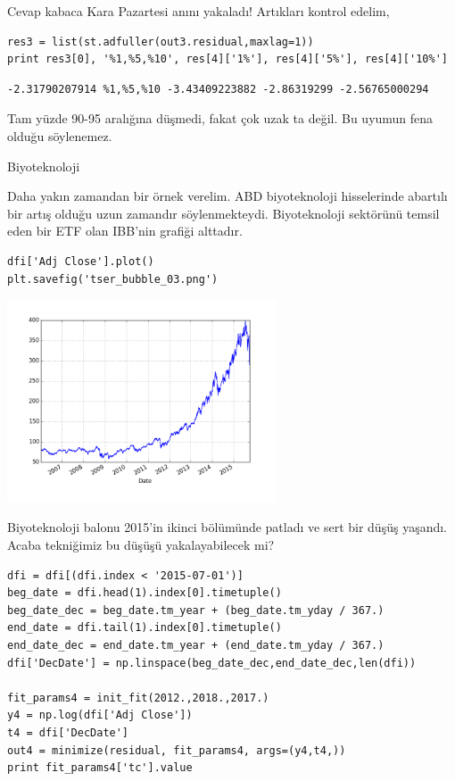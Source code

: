 \documentclass[12pt,fleqn]{article}\usepackage{../../common}
\begin{document}
Cevap kabaca Kara Pazartesi anını yakaladı! Artıkları kontrol edelim,

\begin{verbatim}
res3 = list(st.adfuller(out3.residual,maxlag=1))
print res3[0], '%1,%5,%10', res[4]['1%'], res[4]['5%'], res[4]['10%']
\end{verbatim}

\begin{verbatim}
-2.31790207914 %1,%5,%10 -3.43409223882 -2.86319299 -2.56765000294
\end{verbatim}

Tam yüzde 90-95 aralığına düşmedi, fakat çok uzak ta değil. Bu uyumun fena
olduğu söylenemez.

Biyoteknoloji

Daha yakın zamandan bir örnek verelim. ABD biyoteknoloji hisselerinde
abartılı bir artış olduğu uzun zamandır söylenmekteydi. Biyoteknoloji
sektörünü temsil eden bir ETF olan IBB'nin grafiği alttadır.

\begin{verbatim}
dfi['Adj Close'].plot()
plt.savefig('tser_bubble_03.png')
\end{verbatim}

\includegraphics[height=6cm]{tser_bubble_03.png}

Biyoteknoloji balonu 2015'in ikinci bölümünde patladı ve sert bir düşüş
yaşandı. Acaba tekniğimiz bu düşüşü yakalayabilecek mi?

\begin{verbatim}
dfi = dfi[(dfi.index < '2015-07-01')] 
beg_date = dfi.head(1).index[0].timetuple()
beg_date_dec = beg_date.tm_year + (beg_date.tm_yday / 367.)
end_date = dfi.tail(1).index[0].timetuple()
end_date_dec = end_date.tm_year + (end_date.tm_yday / 367.)
dfi['DecDate'] = np.linspace(beg_date_dec,end_date_dec,len(dfi))

fit_params4 = init_fit(2012.,2018.,2017.)
y4 = np.log(dfi['Adj Close'])
t4 = dfi['DecDate']
out4 = minimize(residual, fit_params4, args=(y4,t4,))
print fit_params4['tc'].value 
\end{verbatim}
\end{document}
